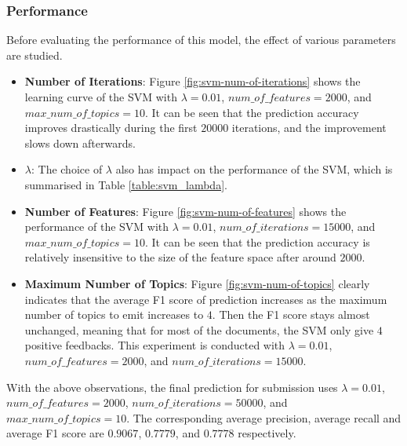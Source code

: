 \documentclass[11pt]{article}
\begin{document}
\subsubsection*{Performance}
Before evaluating the performance of this model, the effect of various parameters are studied.

\begin{itemize}
    \item{\textbf{Number of Iterations}: 
    Figure \ref{fig:svm-num-of-iterations} shows the learning curve of the SVM with $\lambda=0.01$, $num\_of\_features=2000$, and $max\_num\_of\_topics = 10$.
    It can be seen that the prediction accuracy improves drastically during the first $20000$ iterations, and the improvement slows down afterwards.
    }
    \item{\textbf{$\lambda$}: 
    The choice of $\lambda$ also has impact on the performance of the SVM, which is summarised in Table \ref{table:svm_lambda}.
    }
    \item{\textbf{Number of Features}: 
    Figure \ref{fig:svm-num-of-features} shows the performance of the SVM with $\lambda=0.01$, \newline$num\_of\_iterations=15000$, and $max\_num\_of\_topics = 10$.
    It can be seen that the prediction accuracy is relatively insensitive to the size of the feature space after around $2000$.
    }
    \item{\textbf{Maximum Number of Topics}: 
    Figure \ref{fig:svm-num-of-topics} clearly indicates that the average F1 score of prediction increases as the maximum number of topics to emit increases to $4$.
    Then the F1 score stays almost unchanged, meaning that for most of the documents, the SVM only give $4$ positive feedbacks.
    This experiment is conducted with $\lambda=0.01$, $num\_of\_features=2000$, and $num\_of\_iterations = 15000$.
    }
\end{itemize}

With the above observations, the final prediction for submission uses  $\lambda=0.01$, $num\_of\_features=2000$, $num\_of\_iterations = 50000$, and $max\_num\_of\_topics = 10$.
The corresponding average precision, average recall and average F1 score are $0.9067$, $0.7779$, and $0.7778$ respectively.
\end{document}
